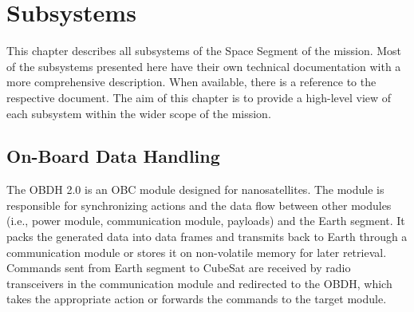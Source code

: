 %
%
%
%
%

%
%
%
%
%
%

\chapter{Subsystems} \label{ch:subsystems}



This chapter describes all subsystems of the Space Segment of the mission. Most of the subsystems presented here have their own technical documentation with a more comprehensive description. When available, there is a reference to the respective document. The aim of this chapter is to provide a high-level view of each subsystem within the wider scope of the mission.

\section{On-Board Data Handling}

The \ac{OBDH} 2.0 is an \ac{OBC} module designed for nanosatellites. The module is responsible for synchronizing actions and the data flow between other modules (i.e., power module, communication module, payloads) and the Earth segment. It packs the generated data into data frames and transmits back to Earth through a communication module or stores it on non-volatile memory for later retrieval. Commands sent from Earth segment to CubeSat are received by radio transceivers in the communication module and redirected to the \ac{OBDH}, which takes the appropriate action or forwards the commands to the target module.

